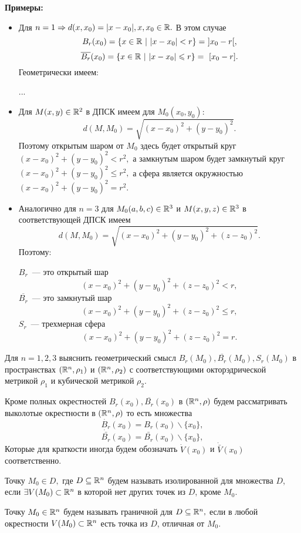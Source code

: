 \documentclass[../main.tex]{subfiles}
\begin{document}
	\textbf{Примеры:}
	\begin{itemize}
	\item Для $n = 1 \Rightarrow d(x, x_0) = |x - x_0|, x, x_0 \in \mathbb{R}.$ В этом случае 
	$$
		B_r(x_0) = \{x \in \mathbb{R}\ |\ |x - x_0| < r\} =\ ] x_0 - r [,
	$$
	$$
		\overline{B_r}(x_0) = \{x \in \mathbb{R}\ |\ |x - x_0| \leqslant r\} =\ [ x_0 - r ].
	$$
	Геометрически имеем:
	
	...
	
	\item  Для $M(x, y) \in \mathbb{R}^2$ в ДПСК имеем для $M_0(x_0, y_0)$:
	$$
		d(M, M_0) = \sqrt{(x - x_0)^2 + (y - y_0)^2}.
	$$
	Поэтому открытым шаром от $M_0$ здесь будет открытый круг 
	$
		(x - x_0)^2 + (y - y_0)^2 < r^2,
	$ 
	а замкнутым шаром будет замкнутый круг 
	$
		(x - x_0)^2 + (y - y_0)^2 \leqslant r^2,
	$ 
	а сфера является окружностью 
	$
		(x - x_0)^2 + (y - y_0)^2 = r^2.
	$ 
	
	\item Аналогично для $n = 3$ для $M_0(a, b, c) \in \mathbb{R}^3$ и $M(x, y, z) \in \mathbb{R}^3$ в соответствующей ДПСК имеем  
	$$
		d(M, M_0) = \sqrt{(x - x_0)^2 + (y - y_0)^2 + (z - z_0)^2}.
	$$
	Поэтому:
	
	$B_r$~--- это открытый шар
	$$
		(x - x_0)^2 + (y - y_0)^2 + (z - z_0)^2 < r,
	$$
	$\overline{B_r}$~--- это замкнутый шар
	$$
	(x - x_0)^2 + (y - y_0)^2 + (z - z_0)^2 \leqslant r,
	$$	
	$S_r$~--- трехмерная сфера
	$$
	(x - x_0)^2 + (y - y_0)^2 + (z - z_0)^2 = r.
	$$
	\end{itemize}
	\begin{exc}
		Для $n = 1, 2, 3$  выяснить геометрический смысл $B_r(M_0), \overline{B_r}(M_0),  S_r(M_0)$ в пространствах $(\mathbb{R}^n, \rho_1)$ и $(\mathbb{R}^n, \rho_2)$  с соответствующими окторэдрической метрикой $\rho_1$ и кубической метрикой $\rho_2$. 
	\end{exc}
	\begin{rem}
		Кроме полных окрестностей $B_r(x_0), \overline{B_r}(x_0)$ в $(\mathbb{R}^n, \rho)$ будем рассматривать выколотые окрестности в $(\mathbb{R}^n, \rho)$ то есть множества
		$$
			\dot{B_r}(x_0) = B_r(x_0) \backslash \{x_0\},
		$$
		$$
			\dot{\bar{B_r}}(x_0) = \bar{B_r}(x_0) \backslash \{x_0\},
		$$
		Которые для краткости иногда будем обозначать $\dot{V}(x_0) $ и $\dot{\bar{V}}(x_0)$ соответственно. 
	\end{rem}
	\smallskip
	Точку $M_0 \in D,$ где $D \subseteq \mathbb{R}^n$ будем называть изолированной для множества $D$, если $\exists V(M_0) \subset \mathbb{R}^n$ в которой нет других точек из $D$, кроме $M_0$.
	
	Точку $M_0 \in \mathbb{R}^n$ будем называть граничной для $D \subseteq \mathbb{R}^n,$ если в любой окрестности $V(M_0) \subset \mathbb{R}^n$ есть точка из $D$, отличная от $M_0$. 
	
\end{document}

